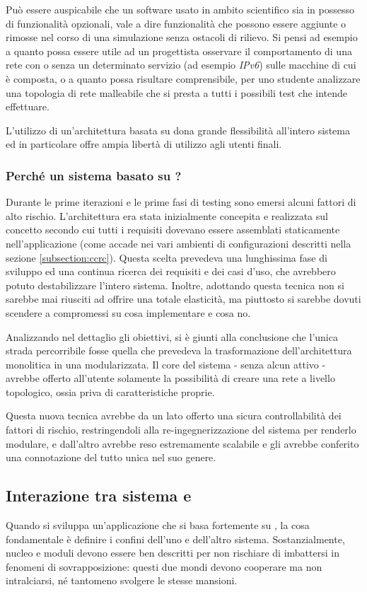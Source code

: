 Può essere auspicabile che un software usato in ambito scientifico sia in possesso di funzionalità opzionali, vale a dire funzionalità che possono essere aggiunte o rimosse nel corso di una simulazione senza ostacoli di rilievo. Si pensi ad esempio a quanto possa essere utile ad un progettista osservare il comportamento di una rete con o senza un determinato servizio (ad esempio \emph{IPv6}) sulle macchine di cui è composta, o a quanto possa risultare comprensibile, per uno studente analizzare una topologia di rete malleabile che si presta a tutti i possibili test che intende effettuare.

L'utilizzo di un'architettura basata su \plugin{} dona grande flessibilità all'intero sistema ed in particolare offre ampia libertà di utilizzo agli utenti finali.

\subsubsection{Perché un sistema basato su \plugin{}?}
Durante le prime iterazioni e le prime fasi di testing sono emersi alcuni fattori di alto rischio. L'architettura era stata inizialmente concepita e realizzata sul concetto secondo cui tutti i requisiti dovevano essere assemblati staticamente nell'applicazione (come accade nei vari ambienti di configurazioni descritti nella sezione \ref{subsection:ccrc}).
Questa scelta prevedeva una lunghissima fase di sviluppo ed una continua ricerca dei requisiti e dei casi d'uso, che avrebbero potuto destabilizzare l'intero sistema. Inoltre, adottando questa tecnica non si sarebbe mai riusciti ad offrire una totale elasticità, ma piuttosto si sarebbe dovuti scendere a compromessi su cosa implementare e cosa no.

Analizzando nel dettaglio gli obiettivi, si è giunti alla conclusione che l'unica strada percorribile fosse quella che prevedeva la trasformazione dell'architettura monolitica in una modularizzata. Il core del sistema - senza alcun \plugin{} attivo - avrebbe offerto all'utente solamente la possibilità di creare una rete a livello topologico, ossia priva di caratteristiche proprie.

Questa nuova tecnica avrebbe da un lato offerto una sicura controllabilità dei fattori di rischio, restringendoli alla re-ingegnerizzazione del sistema per renderlo modulare, e dall'altro avrebbe reso \visualnetkit{} estremamente scalabile e gli avrebbe conferito una connotazione del tutto unica nel suo genere.

\subsection{Interazione tra sistema e \plugin{}}
Quando si sviluppa un'applicazione che si basa fortemente su \plugin{}, la cosa fondamentale è definire i confini dell'uno e dell'altro sistema. Sostanzialmente, nucleo e moduli devono essere ben descritti per non rischiare di imbattersi in fenomeni di sovrapposizione: questi due mondi devono cooperare ma non intralciarsi, né tantomeno svolgere le stesse mansioni.

